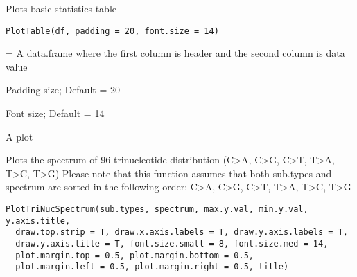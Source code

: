\documentclass[letterpaper]{book}
\begin{document}
%
\begin{Description}\relax
Plots basic statistics table
\end{Description}
%
\begin{Usage}
\begin{verbatim}
PlotTable(df, padding = 20, font.size = 14)
\end{verbatim}
\end{Usage}
%
\begin{Arguments}
\begin{ldescription}
\item[\code{df}] = A data.frame where the first column is header and the second column is data value

\item[\code{padding}] Padding size; Default = 20

\item[\code{font.size}] Font size; Default = 14
\end{ldescription}
\end{Arguments}
%
\begin{Value}
A plot
\end{Value}
%
\begin{Description}\relax
Plots the spectrum of 96 trinucleotide distribution
(C>A, C>G, C>T, T>A, T>C, T>G)
Please note that this function assumes that both sub.types and spectrum
are sorted in the following order: C>A, C>G, C>T, T>A, T>C, T>G
\end{Description}
%
\begin{Usage}
\begin{verbatim}
PlotTriNucSpectrum(sub.types, spectrum, max.y.val, min.y.val, y.axis.title,
  draw.top.strip = T, draw.x.axis.labels = T, draw.y.axis.labels = T,
  draw.y.axis.title = T, font.size.small = 8, font.size.med = 14,
  plot.margin.top = 0.5, plot.margin.bottom = 0.5,
  plot.margin.left = 0.5, plot.margin.right = 0.5, title)
\end{verbatim}
\end{Usage}
%
\end{document}
